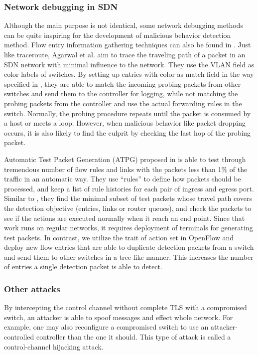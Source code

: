 \documentclass[conference]{IEEEtran}
\begin{document}
\subsubsection{Network debugging in SDN}
Although the main purpose is not identical, some network debugging methods can be quite inspiring for the development of malicious behavior detection method. Flow entry information gathering techniques can also be found in \cite{ARDC14}. Just like traceroute, Agarwal et al. aim to trace the traveling path of a packet in an SDN network with minimal influence to the network. They use the VLAN field as color labels of switches. By setting up entries with color as match field in the way specified in \cite{ARDC14}, they are able to match the incoming probing packets from other switches and send them to the controller for logging, while not matching the probing packets from the controller and use the actual forwarding rules in the switch. Normally, the probing procedure repeats until the packet is consumed by a host or meets a loop. However, when malicious behavior like packet dropping occurs, it is also likely to find the culprit by checking the last hop of the probing packet.

Automatic Test Packet Generation (ATPG) proposed in \cite{ZKVM12} is able to test through tremendous number of flow rules and links with the packets less than 1\% of the traffic in an automatic way. They use ``rules'' to define how packets should be processed, and keep a list of rule histories for each pair of ingress and egress port. Similar to \cite{PJL16}, they find the minimal subset of test packets whose travel path covers the detection objective (entries, links or router queues), and check the packets to see if the actions are executed normally when it reach an end point. Since that work runs on regular networks, it requires deployment of terminals for generating test packets. In contrast, we utilize the trait of action set in OpenFlow and deploy new flow entries that are able to duplicate detection packets from a switch and send them to other switches in a tree-like manner. This increases the number of entries a single detection packet is able to detect. 

\subsubsection{Other attacks}
By intercepting the control channel without complete TLS with a compromised switch, an attacker is able to spoof messages and effect whole network. For example, one may also reconfigure a compromised switch to use an attacker-controlled controller than the one it should. This type of attack is called a control-channel hijacking attack.
\end{document}
